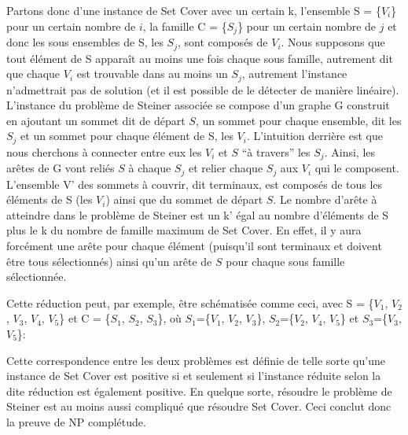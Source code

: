 \documentclass{article}
\begin{document}
Partons donc d'une instance de Set Cover avec un certain k, l'ensemble S = \{$V_i$\} pour un certain nombre de $i$, la famille C = \{$S_j$\} pour un certain nombre de $j$ et donc les sous ensembles de S, les $S_j$, sont composés de $V_i$. Nous supposons que tout élément de S apparaît au moins une fois chaque sous famille, autrement dit que chaque $V_i$ est trouvable dans au moins un $S_j$, autrement l'instance n'admettrait pas de solution (et il est possible de le détecter de manière linéaire).\\
L'instance du problème de Steiner associée se compose d'un graphe G construit en ajoutant un sommet dit de départ $S$, un sommet pour chaque ensemble, dit les $S_j$ et un sommet pour chaque élément de S, les $V_i$. L'intuition derrière est que nous cherchons à connecter entre eux les $V_i$ et $S$ ``à travers'' les $S_j$. Ainsi, les arêtes de G vont reliés $S$ à chaque $S_j$ et relier chaque $S_j$ aux $V_i$ qui le composent. L'ensemble V' des sommets à couvrir, dit terminaux, est composés de tous les éléments de S (les $V_i$) ainsi que du sommet de départ $S$. Le nombre d'arête à atteindre dans le problème de Steiner est un k' égal au nombre d'éléments de S plus le k du nombre de famille maximum de Set Cover. En effet, il y aura forcément une arête pour chaque élément (puisqu'il sont terminaux et doivent être tous sélectionnés) ainsi qu'un arête de $S$ pour chaque sous famille sélectionnée.
\\ \par
Cette réduction peut, par exemple, être schématisée comme ceci, avec S =  \{$V_1$, $V_2$, $V_3$, $V_4$, $V_5$\} et C = \{$S_1$, $S_2$, $S_3$\}, où $S_1$=\{$V_1$, $V_2$, $V_3$\}, $S_2$=\{$V_2$, $V_4$, $V_5$\} et $S_3$=\{$V_3$, $V_5$\}:
\vspace{1cm}
\begin{center}
\end{center}
\vspace{1cm}
Cette correspondence entre les deux problèmes est définie de telle sorte qu'une instance de Set Cover est positive si et seulement si l'instance réduite selon la dite réduction est également positive. En quelque sorte, résoudre le problème de Steiner est au moins aussi compliqué que résoudre Set Cover. Ceci conclut donc la preuve de NP complétude. 
\end{document}
